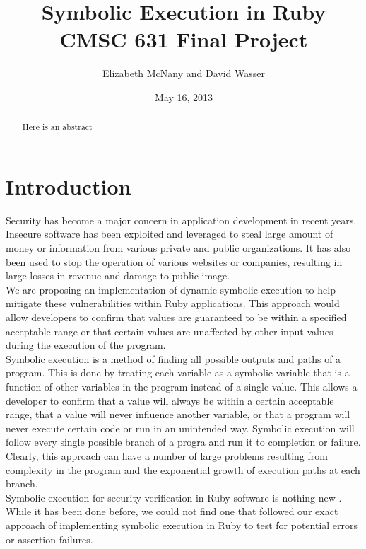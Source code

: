 \documentclass[10pt]{article}
\title{Symbolic Execution in Ruby\\
CMSC 631 Final Project}
\author{Elizabeth McNany and David Wasser}
\date{May 16, 2013}
\begin{document}
\maketitle

\begin{abstract}
Here is an abstract
\end{abstract}

\section{Introduction}
Security has become a major concern in application development in recent years.  Insecure software has been exploited and leveraged to steal large amount of money or information from various private and public organizations.  It has also been used to stop the operation of various websites or companies, resulting in large losses in revenue and damage to public image.\\

We are proposing an implementation of dynamic symbolic execution to help mitigate these vulnerabilities within Ruby applications.  This approach would allow developers to confirm that values are guaranteed to be within a specified acceptable range or that certain values are unaffected by other input values during the execution of the program.\\

Symbolic execution is a method of finding all possible outputs and paths of a program.  This is done by treating each variable as a symbolic variable that is a function of other variables in the program instead of a single value.  This allows a developer to confirm that a value will always be within a certain acceptable range, that a value will never influence another variable, or that a program will never execute certain code or run in an unintended way.  Symbolic execution will follow every single possible branch of a progra and run it to completion or failure.  Clearly, this approach can have a number of large problems resulting from complexity in the program and the exponential growth of execution paths at each branch.\\

Symbolic execution for security verification in Ruby software is nothing new \cite{rails}.  While it has been done before, we could not find one that followed our exact approach of implementing symbolic execution in Ruby to test for potential errors or assertion failures.\\
\end{document}
